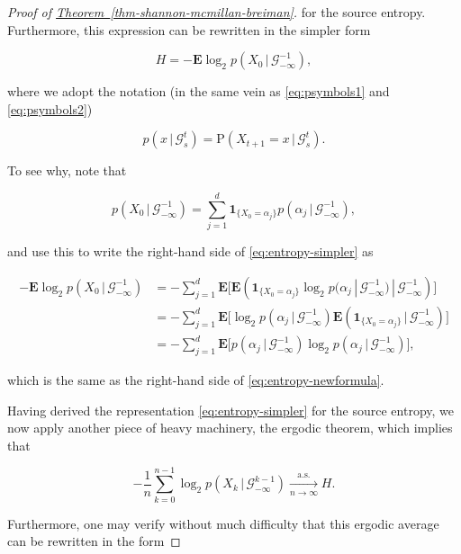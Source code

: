 \documentclass[11pt]{report}
\theoremstyle{plain}
\theoremstyle{definition}
\begin{document}
\begin{proof}[Proof of \texorpdfstring{\hyperref[thm-shannon-mcmillan-breiman]{Theorem~\ref*{thm-shannon-mcmillan-breiman}}}{Theorem}]
\noindent for the source entropy. Furthermore, this expression
can be rewritten in the simpler form

\begin{equation*} \tag{36}\label{eq:entropy-simpler}
H = -\mathbf{E} \log_2 p(X_0\,|\,\mathcal{G}_{-\infty}^{-1}),
\end{equation*}

\noindent where we adopt the notation (in the same vein as
\eqref{eq:psymbols1} and \eqref{eq:psymbols2})

\begin{equation*} \tag{37}\label{eq:psymbols-generalized}
p(x\,|\,\mathcal{G}_s^t) = \mathrm{P}\left(X_{t+1}=x\,|\,\mathcal{G}_s^t\right).
\end{equation*}

\noindent To see why, note that

\[
p(X_0\,|\,\mathcal{G}_{-\infty}^{-1}) = \sum_{j=1}^d \mathbf{1}_{\{X_0=\alpha_j\}} p(\alpha_j\,|\,\mathcal{G}_{-\infty}^{-1}),
\]

\noindent and use this to write the right-hand side of
\eqref{eq:entropy-simpler} as

\begin{align*}
-\mathbf{E} \log_2 p(X_0\,|\,\mathcal{G}_{-\infty}^{-1})
&=
-\sum_{j=1}^d \mathbf{E}\Big[
\mathbf{E}\left(
\mathbf{1}_{\{X_0=\alpha_j\}}
\log_2 p(\alpha_j\,|\,\mathcal{G}_{-\infty}^{-1})
\,|\,\mathcal{G}_{-\infty}^{-1}\right)
\Big] \\
&= -\sum_{j=1}^d \mathbf{E}\Big[ \log_2 p(\alpha_j\,|\,\mathcal{G}_{-\infty}^{-1})
\mathbf{E}\left(\mathbf{1}_{\{X_0=\alpha_j\}}\,|\,\mathcal{G}_{-\infty}^{-1}\right)
\Big] \\
&= -\sum_{j=1}^d \mathbf{E}\Big[
p(\alpha_j\,|\,\mathcal{G}_{-\infty}^{-1})
\log_2 p(\alpha_j\,|\,\mathcal{G}_{-\infty}^{-1})
\Big],
\end{align*}

\noindent which is the same as the right-hand side of
\eqref{eq:entropy-newformula}.

Having derived the representation
\eqref{eq:entropy-simpler} for the source entropy, we now
apply another piece of heavy machinery, the ergodic
theorem, which implies that

\[
-\frac{1}{n} \sum_{k=0}^{n-1} \log_2 p(X_k\,|\,\mathcal{G}_{-\infty}^{k-1}) \xrightarrow[n\to\infty]{\textrm{a.s.}} H.
\]

\noindent Furthermore, one may verify without much difficulty
that this ergodic average can be rewritten in the form


\end{proof}
\end{document}
